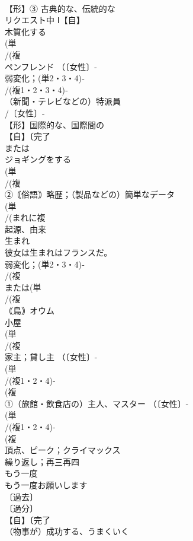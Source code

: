 \documentclass[8pt]{extreport}
\begin{document}
\begin{CJK}{UTF8}{min}
\\	【形】③ 古典的な、伝統的な
\\	リクエスト中	Ⅰ【自】
\\	木質化する
\\	(単
\\	/(複
\\	ペンフレンド （〔女性〕-
\\	弱変化；(単2・3・4)‐
\\	/(複1・2・3・4)‐
\\	（新聞・テレビなどの）特派員　
\\	/〔女性〕-
\\	【形】国際的な、国際間の
\\	【自】〔完了
\\	または
\\	ジョギングをする 
\\	(単
\\	/(複
\\	②｟俗語｠略歴；（製品などの）簡単なデータ 
\\	(単
\\	/(まれに複
\\	起源、由来 
\\	生まれ　
\\	彼女は生まれはフランスだ。
\\	弱変化；(単2・3・4)‐
\\	/(複
\\	または(単
\\	/(複
\\	｟鳥｠オウム 
\\	小屋 
\\	(単
\\	/(複
\\	家主；貸し主 （〔女性〕-
\\	(単
\\	/(複1・2・4)-
\\	(複
\\	①（旅館・飲食店の）主人、マスター （〔女性〕-
\\	(単
\\	/(複1・2・4)-
\\	(複
\\	頂点、ピーク；クライマックス
\\	繰り返し；再三再四
\\	もう一度 
\\	もう一度お願いします
\\	〔過去〕
\\	〔過分〕
\\	【自】〔完了
\\	（物事が）成功する、うまくいく 

\end{CJK}
\end{document}
